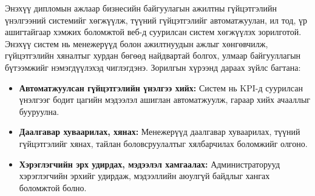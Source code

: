 Энэхүү дипломын ажлаар бизнесийн байгуулагын ажилтны гүйцэтгэлийн үнэлгээний системийг хөгжүүлж, 
түүний гүйцэтгэлийг автоматжуулан, ил тод, үр ашигтайгаар хэмжих боломжтой веб-д 
суурилсан систем хөгжүүлэх зорилготой. Энэхүү систем нь менежерүүд болон ажилтнуудын ажлыг хөнгөвчилж, 
гүйцэтгэлийн хяналтыг хурдан бөгөөд найдвартай болгох, улмаар байгууллагын бүтээмжийг нэмэгдүүлэхэд чиглэгдэнэ.
Зорилгын хүрээнд дараах зүйлс багтана:
\begin{itemize}
    \item \textbf{Автоматжуулсан гүйцэтгэлийн үнэлгээ хийх:} Систем нь KPI-д суурилсан үнэлгээг бодит цагийн мэдээлэл ашиглан автоматжуулж, гараар хийх ачааллыг бууруулна.
    \item \textbf{Даалгавар хуваарилах, хянах:} Менежерүүд даалгавар хуваарилах, түүний гүйцэтгэлийг хянах, тайлан боловсруулалтыг хялбарчилах боломжийг олгоно.
    \item \textbf{Хэрэглэгчийн эрх удирдах, мэдээлэл хамгаалах:} Администраторууд хэрэглэгчийн эрхийг удирдаж, мэдээллийн аюулгүй байдлыг хангах боломжтой болно.
\end{itemize}